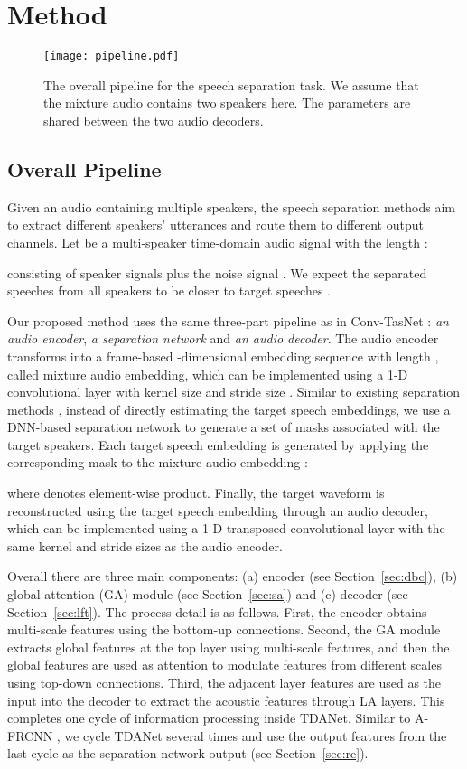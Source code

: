 \documentclass{article} \usepackage{iclr2023_conference,times}
\begin{document}
\section{Method}
\begin{figure}[ht]
\centering
\texttt{[image: pipeline.pdf]}
\caption{The overall pipeline for the speech separation task. We assume that the mixture audio contains two speakers here. The parameters are shared between the two audio decoders.}
\label{fig:pipeline}
\end{figure}

\subsection{Overall Pipeline}

Given an audio containing multiple speakers, the speech separation methods aim to extract different speakers' utterances and route them to different output channels. Let  be a multi-speaker time-domain audio signal with the length :

consisting of  speaker signals  plus the noise signal . We expect the separated speeches  from all speakers to be closer to target speeches .

Our proposed method uses the same three-part pipeline as in Conv-TasNet \citep{luo2019conv}: \textit{an audio encoder}, \textit{a separation network} and \textit{an audio decoder}. The audio encoder transforms  into a frame-based -dimensional embedding sequence  with length , called mixture audio embedding, which can be implemented using a 1-D convolutional layer with kernel size  and stride size . Similar to existing separation methods \citep{luo2019conv, luo2018tasnet, luo2020dual, subakan2021attention, Chen2020, li2022use}, instead of directly estimating the target speech embeddings, we use a DNN-based separation network  to generate a set of masks  associated with the target speakers. Each target speech embedding  is generated by applying the corresponding mask  to the mixture audio embedding :

where  denotes element-wise product. Finally, the target waveform  is reconstructed using the target speech embedding  through an audio decoder, which can be implemented using a 1-D transposed convolutional layer with the same kernel and stride sizes as the audio encoder.

Overall there are three main components: (a) encoder (see Section~\ref{sec:dbc}), (b) global attention (GA) module (see Section~\ref{sec:sa}) and (c) decoder (see Section~\ref{sec:lft}). The process detail is as follows. First, the encoder obtains multi-scale features using the bottom-up connections. Second, the GA module extracts global features at the top layer using multi-scale features, and then the global features are used as attention to modulate features from different scales using top-down connections.
Third, the adjacent layer features are used as the input into the decoder to extract the acoustic features through LA layers. This completes one cycle of information processing inside TDANet. Similar to A-FRCNN \cite{hu2021speech}, we cycle TDANet several times and use the output features from the last cycle as the separation network output (see Section~\ref{sec:re}).
\end{document}
